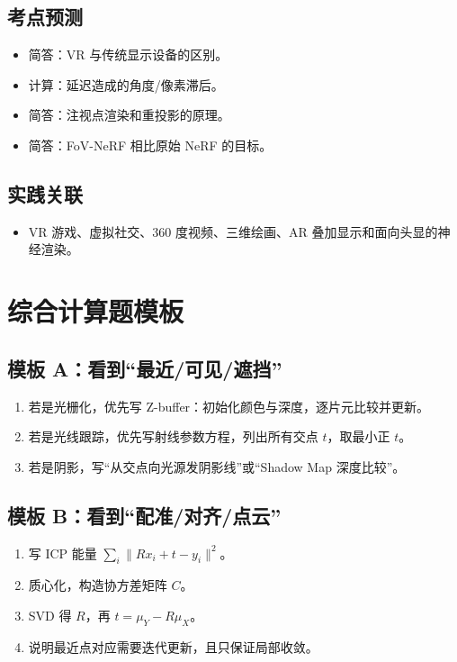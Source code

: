 \documentclass[UTF8,zihao=-4,scheme=chinese,fontset=fandol]{ctexart}
\begin{document}
\subsection{考点预测}
\begin{itemize}
  \item 简答：VR 与传统显示设备的区别。
  \item 计算：延迟造成的角度/像素滞后。
  \item 简答：注视点渲染和重投影的原理。
  \item 简答：FoV-NeRF 相比原始 NeRF 的目标。
\end{itemize}

\subsection{实践关联}
\begin{itemize}
  \item VR 游戏、虚拟社交、360 度视频、三维绘画、AR 叠加显示和面向头显的神经渲染。
\end{itemize}

\section{综合计算题模板}

\subsection{模板 A：看到“最近/可见/遮挡”}
\begin{enumerate}
  \item 若是光栅化，优先写 Z-buffer：初始化颜色与深度，逐片元比较并更新。
  \item 若是光线跟踪，优先写射线参数方程，列出所有交点 $t$，取最小正 $t$。
  \item 若是阴影，写“从交点向光源发阴影线”或“Shadow Map 深度比较”。
\end{enumerate}

\subsection{模板 B：看到“配准/对齐/点云”}
\begin{enumerate}
  \item 写 ICP 能量 $\sum_i\|Rx_i+t-y_i\|^2$。
  \item 质心化，构造协方差矩阵 $C$。
  \item SVD 得 $R$，再 $t=\mu_Y-R\mu_X$。
  \item 说明最近点对应需要迭代更新，且只保证局部收敛。
\end{enumerate}
\end{document}
